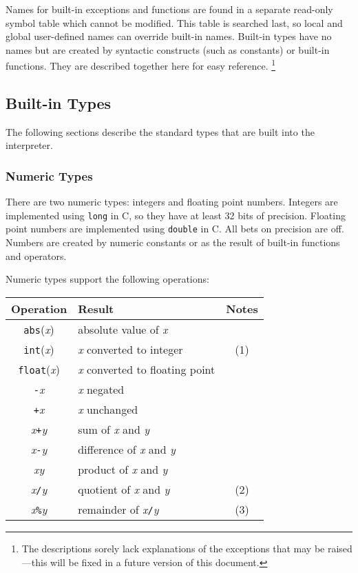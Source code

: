 Names for built-in exceptions and functions are found in a separate
read-only symbol table which cannot be modified.
This table is searched last, so local and global user-defined names can
override built-in names.
Built-in types have no names but are created by syntactic constructs
(such as constants) or built-in functions.
They are described together here for easy reference.%
\footnote{
The descriptions sorely lack explanations of the exceptions that
may be raised---this will be fixed in a future version of this
document.
}

\subsection{Built-in Types}

The following sections describe the standard types that are built into the
interpreter.
\subsubsection{Numeric Types}

There are two numeric types: integers and floating point numbers.
Integers are implemented using {\tt long} in C, so they have at least 32
bits of precision.
Floating point numbers are implemented using {\tt double} in C.
All bets on precision are off.
Numbers are created by numeric constants or as the result of built-in
functions and operators.

Numeric types support the following operations:

\begin{center}
\begin{tabular}{|c|l|c|}
\hline
Operation & Result & Notes \\
\hline
{\tt abs}({\em x}) & absolute value of {\em x} & \\
{\tt int}({\em x}) & {\em x} converted to integer & (1) \\
{\tt float}({\em x}) & {\em x} converted to floating point & \\
{\tt -}{\em x} & {\em x} negated & \\
{\tt +}{\em x} & {\em x} unchanged & \\
{\em x}{\tt +}{\em y} & sum of {\em x} and {\em y} & \\
{\em x}{\tt -}{\em y} & difference of {\em x} and {\em y} & \\
{\em x}{\tt *}{\em y} & product of {\em x} and {\em y} & \\
{\em x}{\tt /}{\em y} & quotient of {\em x} and {\em y} & (2) \\
{\em x}{\tt \%}{\em y} & remainder of {\em x}{\tt /}{\em y} & (3) \\
\hline
\end{tabular}
\end{center}

